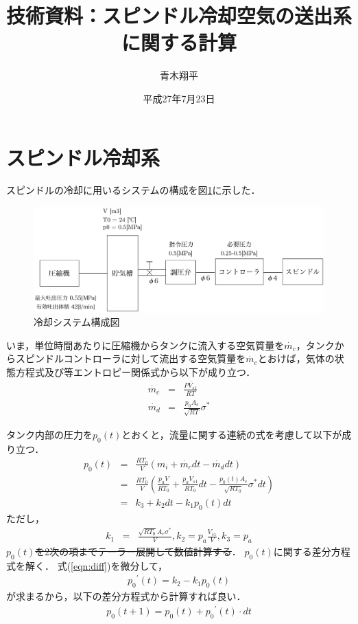\documentclass{jsarticle}
\begin{document}
\title{技術資料：スピンドル冷却空気の送出系に関する計算}
\author{青木翔平}
\date{平成27年7月23日}
\maketitle

\section{スピンドル冷却系}
スピンドルの冷却に用いるシステムの構成を図\ref{fig:system}に示した．
\begin{figure}[htbp]
 \centering
 \includegraphics[width=150mm]{system.pdf}
 \caption{冷却システム構成図}
 \label{fig:system}
\end{figure}

いま，単位時間あたりに圧縮機からタンクに流入する空気質量を$\dot{m_{c}}$，タンクからスピンドルコントローラに対して流出する空気質量を$\dot{m_{c}}$とおけば，気体の状態方程式及び等エントロピー関係式から以下が成り立つ．
\begin{eqnarray}
  \dot{m_c} & = &  \frac{P\dot{V_{s1}}}{RT}  \\
  \dot{m_d} & = & \frac{p_0 A_e }{\sqrt{R T}}\sigma^{*} \label{sigma}
\end{eqnarray}


タンク内部の圧力を$p_0(t)$とおくと，流量に関する連続の式を考慮して以下が成り立つ．
\begin{eqnarray}
  p_0(t) & = & \frac{R T_0}{V} \left( m_i + \dot{m_c} dt - \dot{m_d} dt \right) \nonumber \\
  & = & \frac{R T_0}{V} \left( \frac{p_a V}{R T_0} + \frac{p_a V_{s1}}{R T_0}dt - \frac{p_0(t) A_e}{\sqrt{R T_0}} \sigma^{*} dt \right) \nonumber \\
  & = & k_3 + k_2 dt - k_1 p_0(t) dt \label{eqn:diff} 
\end{eqnarray}
ただし，
\begin{eqnarray}
  k_1 & = & \frac{\sqrt{R T_0} A_e \sigma^{*}}{V}, k_2 = p_a \frac{V_{s1}}{V}, k_3 = p_{a}
\end{eqnarray}
\sout{ $p_0(t)$を2次の項までテーラー展開して数値計算する}．
$p_0(t)$に関する差分方程式を解く．
式(\ref{eqn:diff})を微分して，
\begin{eqnarray}
  {p_0}^{\prime}(t) =  k_2 - k_1 p_0(t) 
\end{eqnarray}
が求まるから，以下の差分方程式から計算すれば良い．
\begin{eqnarray}
{p_0}(t+1) = {p_0}(t) + {p_0}^{\prime}(t) \cdot dt 
\end{eqnarray}
\end{document}
